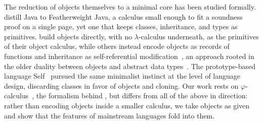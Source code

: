 The reduction of objects themselves to a minimal core has been studied
  formally.
\citet{igarashi2001featherweight} distill Java to Featherweight Java, a
  calculus small enough to fit a soundness proof on a single page, yet one
  that keeps classes, inheritance, and types as primitives.
\citet{abadi1996theory} build objects directly, with no \(\lambda\)-calculus
  underneath, as the primitives of their object calculus, while others instead
  encode objects as records of functions and inheritance as self-referential
  modification~\citep{kamin1988inheritance,cook1989denotational}, an approach
  rooted in the older duality between objects and abstract data
  types~\citep{reynolds1978user}.
The prototype-based language Self~\citep{ungar1987self} pursued the same
  minimalist instinct at the level of language design, discarding classes in
  favor of objects and cloning.
Our work rests on \(\varphi\)-calculus~\citep{bugayenko2021eolang,
  kudasov2022formalizing}, the formalism behind \eolang{}, but differs from
  all of the above in direction: rather than encoding objects inside a smaller
  calculus, we take objects as given and show that the features of mainstream
  languages fold into them.
